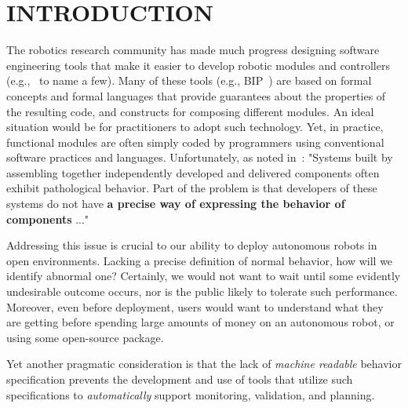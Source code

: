 \documentclass[ 5p, 12pt, times, twocolumn, sort&compress ]{elsarticle}
\begin{document}


\section{INTRODUCTION}

The robotics research community has made much progress designing software engineering tools that make it easier to develop
robotic modules and controllers (e.g.,~\cite{PRS,TCA,RPML} to name a few). Many of these tools (e.g., BIP~\cite{BIP,BIP2}) are based on formal concepts and formal languages that provide  guarantees about the properties of the resulting code, and constructs for composing
different modules. An ideal situation would be for practitioners to adopt such technology. Yet, in practice, functional modules are often simply coded
by programmers using conventional software practices and languages.
Unfortunately, as noted in~\cite{Abdellatif12}:  "Systems built by assembling together independently developed and delivered components often exhibit pathological behavior. Part of the problem is that developers of these systems do not have 
{\bf a precise way of expressing the behavior of components\/} ..."

Addressing this issue is crucial to our ability to deploy autonomous robots in open environments. 
Lacking a precise definition of normal behavior, how will we identify abnormal one? Certainly, we would not want to wait until 
some evidently undesirable outcome occurs, nor is the public likely to tolerate such performance.
Moreover, even before deployment, users would want to understand what they are getting 
before spending large amounts of money on an autonomous robot, or using some open-source package.

Yet another pragmatic consideration is that the lack of {\em machine readable\/} behavior specification prevents the development and
use of tools that utilize such specifications to {\em automatically\/} support monitoring, validation, and planning.
%
\end{document}

